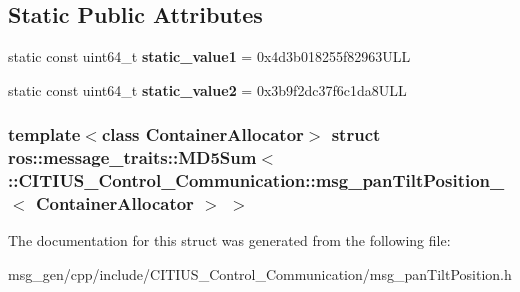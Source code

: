 \subsection*{\-Static \-Public \-Attributes}
\begin{DoxyCompactItemize}
\item 
\hypertarget{structros_1_1message__traits_1_1_m_d5_sum_3_01_1_1_c_i_t_i_u_s___control___communication_1_1msg_931f14414178b5de77b11204b4610e37_a009d1373786842a023c39ed0b547ce5b}{static const uint64\-\_\-t {\bfseries static\-\_\-value1} = 0x4d3b018255f82963\-U\-L\-L}\label{structros_1_1message__traits_1_1_m_d5_sum_3_01_1_1_c_i_t_i_u_s___control___communication_1_1msg_931f14414178b5de77b11204b4610e37_a009d1373786842a023c39ed0b547ce5b}

\item 
\hypertarget{structros_1_1message__traits_1_1_m_d5_sum_3_01_1_1_c_i_t_i_u_s___control___communication_1_1msg_931f14414178b5de77b11204b4610e37_a979d8acd4ec4a7978cc03f448fdb32cf}{static const uint64\-\_\-t {\bfseries static\-\_\-value2} = 0x3b9f2dc37f6c1da8\-U\-L\-L}\label{structros_1_1message__traits_1_1_m_d5_sum_3_01_1_1_c_i_t_i_u_s___control___communication_1_1msg_931f14414178b5de77b11204b4610e37_a979d8acd4ec4a7978cc03f448fdb32cf}

\end{DoxyCompactItemize}
\subsubsection*{template$<$class Container\-Allocator$>$ struct ros\-::message\-\_\-traits\-::\-M\-D5\-Sum$<$ \-::\-C\-I\-T\-I\-U\-S\-\_\-\-Control\-\_\-\-Communication\-::msg\-\_\-pan\-Tilt\-Position\-\_\-$<$ Container\-Allocator $>$ $>$}



\-The documentation for this struct was generated from the following file\-:\begin{DoxyCompactItemize}
\item 
msg\-\_\-gen/cpp/include/\-C\-I\-T\-I\-U\-S\-\_\-\-Control\-\_\-\-Communication/msg\-\_\-pan\-Tilt\-Position.\-h\end{DoxyCompactItemize}
